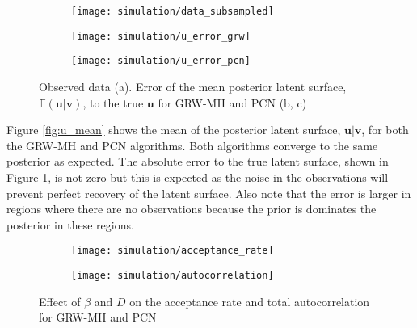 \documentclass[11pt]{article}
\begin{document}
\begin{figure}
    \centering
    \begin{subfigure}{0.3\textwidth}
        \texttt{[image: simulation/data\_subsampled]}
    \end{subfigure}
    \begin{subfigure}{0.3\textwidth}
        \texttt{[image: simulation/u\_error\_grw]}
    \end{subfigure}
    \begin{subfigure}{0.3\textwidth}
        \texttt{[image: simulation/u\_error\_pcn]}
    \end{subfigure}
    \caption{Observed data (a). Error of the mean posterior latent surface, $\mathbb{E}(\boldsymbol{u} | \boldsymbol{v})$, to the true $\boldsymbol{u}$ for GRW-MH and PCN (b, c)}
    \label{fig:u_error}
\end{figure}

Figure \ref{fig:u_mean} shows the mean of the posterior latent surface, $\boldsymbol{u} | \boldsymbol{v}$, for both the GRW-MH and PCN algorithms. Both algorithms converge to the same posterior as expected. The absolute error to the true latent surface, shown in Figure \ref{fig:u_error}, is not zero but this is expected as the noise in the observations will prevent perfect recovery of the latent surface. Also note that the error is larger in regions where there are no observations because the prior is dominates the posterior in these regions.

\begin{figure}
    \centering
    \begin{subfigure}{0.45\textwidth}
        \texttt{[image: simulation/acceptance\_rate]}
        \label{fig:acceptance_rate}
    \end{subfigure}
    \begin{subfigure}{0.45\textwidth}
        \texttt{[image: simulation/autocorrelation]}
        \label{fig:autocorrelation}
    \end{subfigure}
    \caption{Effect of $\beta$ and $D$ on the acceptance rate and total autocorrelation for GRW-MH and PCN}
\end{figure}
\end{document}
